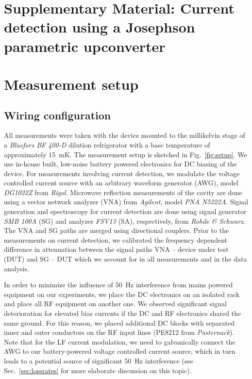 
\section{Supplementary Material: Current detection using a Josephson parametric upconverter}


\section{Measurement setup}\label{sec:measurement}

\subsection{Wiring configuration}

All measurements were taken with the device mounted to the millikelvin stage of a \textit{Bluefors BF 400-D} dilution refrigerator with a base temperature of approximately \SI{15}{\milli\kelvin}.
% 
The measurement setup is sketched in Fig.~\ref{fig:setup}.
% 
We use in-house built, low-noise battery powered electronics for DC biasing of the device.
% 
For measurements involving current detection, we modulate the voltage controlled current source with an arbitrary waveform generator (AWG), model \textit{DG1022Z} from \textit{Rigol}.
% 
Microwave reflection measurements of the cavity are done using a vector network analyzer (VNA) from \textit{Agilent}, model \textit{PNA N5222A}.
% 
Signal generation and spectroscopy for current detection are done using signal generator \textit{SMB 100A} (SG) and analyzer \textit{FSV13} (SA), respectively, from \textit{Rohde \& Schwarz}.
% 
The VNA and SG paths are merged using directional couplers.
% 
Prior to the measurements on current detection, we calibrated the frequency dependent difference in attenuation between the signal paths VNA -- device under test (DUT) and SG -- DUT which we account for in all measurements and in the data analysis.

In order to minimize the influence of \SI{50}{\hertz} interference from mains powered equipment on our experiments, we place the DC electronics on an isolated rack and place all RF equipment on another one.
% 
We observed significant signal deterioration for elevated bias currents if the DC and RF electronics shared the same ground.
% 
For this reason, we placed additional DC blocks with separated inner and outer conductors on the RF input lines (PE8212 from \textit{Pasternack}).
% 
Note that for the LF current modulation, we need to galvanically connect the AWG to our battery-powered voltage controlled current source, which in turn leads to a potential source of significant \SI{50}{\hertz} interference (see Sec.~\ref{sec:lossrates} for more elaborate discussion on this topic).

